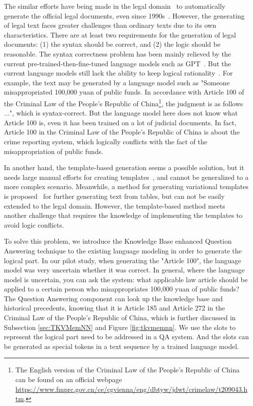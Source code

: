 \documentclass{article}
\begin{document}
The similar efforts have being made in the legal domain~\cite{alschner2017towardsLegalTextsRNN} to automatically generate the official legal documents, even since 1990s~\cite{branting1998techniques}.  
However, the generating of legal text faces greater challenges than ordinary texts due to its own characteristics.
There are at least two requirements for the generation of legal documents: (1) the syntax should be correct, and (2) the logic should be reasonable.
The syntax correctness problem has been mainly relieved by the current pre-trained-then-fine-tuned language models such as GPT~\cite{radford2018improving}.
But the current language models still lack the ability to keep logical rationality~\cite{mao2019improving,guan2020tacl_commensense}. 
For example, the text may be generated by a language model such as "Someone misappropriated 100,000 yuan of public funds. In accordance with Article 100 of the Criminal Law of the People's Republic of China\footnote{The English version of the Criminal Law of the People's Republic of China can be found on an official webpage \url{https://www.fmprc.gov.cn/ce/cgvienna/eng/dbtyw/jdwt/crimelaw/t209043.htm}.}, the judgment is as follows ...", which is syntax-correct.
But the language model here does not know what Article 100 is, even it has been trained on a lot of judicial documents. 
In fact, Article 100 in the Criminal Law of the People's Republic of China is about the crime reporting system, which logically conflicts with the fact of the misappropriation of public funds.

In another hand, the template-based generation seems a possible solution, but it needs large manual efforts for creating templates~\cite{branting1998techniques}, and cannot be generalized to a more complex scenario. 
Meanwhile, a method for generating variational templates is proposed~\cite{ye2020variational} for further generating text from tables, but can not be easily extended to the legal domain. 
However, the template-based method meets another challenge that requires the knowledge of implementing the templates to avoid logic conflicts. 

To solve this problem, we introduce the Knowledge Base enhanced Question Answering technique to the existing language modeling in order to generate the logical part. 
In our pilot study, when generating the "Article 100", the language model was very uncertain whether it was correct. 
In general, where the language model is uncertain, you can ask the system: what applicable law article should be applied to a certain person who misappropriates 100,000 yuan of public funds? 
The Question Answering component can look up the knowledge base and historical precedents, knowing that it is Article 185 and Article 272 in the Criminal Law of the People's Republic of China, which is further discussed in Subsection \ref{sec:TKVMemNN} and Figure \ref{fig:tkvmemnn}. 
We use the slots to represent the logical part need to be addressed in a QA system. 
And the slots can be generated as special tokens in a text sequence by a trained language model. 
\end{document}
